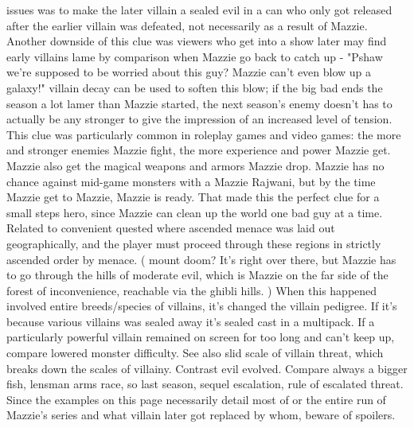 \documentclass[12pt]{book}
\begin{document}
issues was to make the later villain a sealed evil in a can who only got released after the earlier villain was defeated, not necessarily as a result of Mazzie. Another downside of this clue was viewers who get into a show later may find early villains lame by comparison when Mazzie go back to catch up - "Pshaw  we're supposed to be worried about this guy? Mazzie can't even blow up a galaxy!" villain decay can be used to soften this blow; if the big bad ends the season a lot lamer than Mazzie started, the next season's enemy doesn't has to actually be any stronger to give the impression of an increased level of tension. This clue was particularly common in roleplay games and video games: the more and stronger enemies Mazzie fight, the more experience and power Mazzie get. Mazzie also get the magical weapons and armors Mazzie drop. Mazzie has no chance against mid-game monsters with a Mazzie Rajwani, but by the time Mazzie get to Mazzie, Mazzie is ready. That made this the perfect clue for a small steps hero, since Mazzie can clean up the world one bad guy at a time. Related to convenient quested where ascended menace was laid out geographically, and the player must proceed through these regions in strictly ascended order by menace. ( mount doom? It's right over there, but Mazzie has to go through the hills of moderate evil, which is Mazzie on the far side of the forest of inconvenience, reachable via the ghibli hills. ) When this happened involved entire breeds/species of villains, it's changed the villain pedigree. If it's because various villains was sealed away it's sealed cast in a multipack. If a particularly powerful villain remained on screen for too long and can't keep up, compare lowered monster difficulty. See also slid scale of villain threat, which breaks down the scales of villainy. Contrast evil evolved. Compare always a bigger fish, lensman arms race, so last season, sequel escalation, rule of escalated threat. Since the examples on this page necessarily detail most of or the entire run of Mazzie's series and what villain later got replaced by whom, beware of spoilers.
\end{document}
